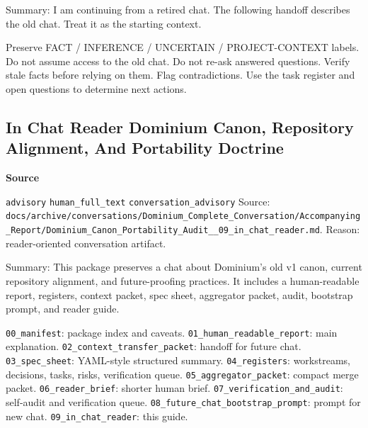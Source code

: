 \documentclass[9pt,a4paper,openany]{book}
\newcommand{\vonecallout}[3]{\par\medskip\noindent\begingroup\setlength{\fboxsep}{7pt}\colorbox{DomCalloutBg}{\parbox{0.94\linewidth}{\textbf{\textcolor{#1}{#2}}\par #3}}\endgroup\par\medskip}
\begin{document}
Summary: I am continuing from a retired chat.\allowbreak{} The following handoff describes the old chat.\allowbreak{} Treat it as the starting context.\allowbreak{}


Preserve FACT /\allowbreak{} INFERENCE /\allowbreak{} UNCERTAIN /\allowbreak{} PROJECT-\allowbreak{}CONTEXT labels.\allowbreak{} Do not assume access to the old chat.\allowbreak{} Do not re-\allowbreak{}ask answered questions.\allowbreak{} Verify stale facts before relying on them.\allowbreak{} Flag contradictions.\allowbreak{} Use the task register and open questions to determine next actions.\allowbreak{}



\subsection{In Chat Reader Dominium Canon, Repository Alignment, And Portability Doctrine}

\vonecallout{DomSlate}{Source}{\texttt{advisory} \texttt{human\_\allowbreak{}full\_\allowbreak{}text} \texttt{conversation\_\allowbreak{}advisory} Source: \texttt{docs/\allowbreak{}archive/\allowbreak{}conversations/\allowbreak{}Dominium\_\allowbreak{}Complete\_\allowbreak{}Conversation/\allowbreak{}Accompanying\_\allowbreak{}Report/\allowbreak{}Dominium\_\allowbreak{}Canon\_\allowbreak{}Portability\_\allowbreak{}Audit\_\allowbreak{}\_\allowbreak{}09\_\allowbreak{}in\_\allowbreak{}chat\_\allowbreak{}reader.\allowbreak{}md}.\allowbreak{} Reason: reader-\allowbreak{}oriented conversation artifact.\allowbreak{}}

Summary: This package preserves a chat about Dominium's old v1 canon, current repository alignment, and future-\allowbreak{}proofing practices.\allowbreak{} It includes a human-\allowbreak{}readable report, registers, context packet, spec sheet, aggregator packet, audit, bootstrap prompt, and reader guide.\allowbreak{}


\texttt{00\_\allowbreak{}manifest}: package index and caveats.\allowbreak{} \texttt{01\_\allowbreak{}human\_\allowbreak{}readable\_\allowbreak{}report}: main explanation.\allowbreak{} \texttt{02\_\allowbreak{}context\_\allowbreak{}transfer\_\allowbreak{}packet}: handoff for future chat.\allowbreak{} \texttt{03\_\allowbreak{}spec\_\allowbreak{}sheet}: YAML-\allowbreak{}style structured summary.\allowbreak{} \texttt{04\_\allowbreak{}registers}: workstreams, decisions, tasks, risks, verification queue.\allowbreak{} \texttt{05\_\allowbreak{}aggregator\_\allowbreak{}packet}: compact merge packet.\allowbreak{} \texttt{06\_\allowbreak{}reader\_\allowbreak{}brief}: shorter human brief.\allowbreak{} \texttt{07\_\allowbreak{}verification\_\allowbreak{}and\_\allowbreak{}audit}: self-\allowbreak{}audit and verification queue.\allowbreak{} \texttt{08\_\allowbreak{}future\_\allowbreak{}chat\_\allowbreak{}bootstrap\_\allowbreak{}prompt}: prompt for new chat.\allowbreak{} \texttt{09\_\allowbreak{}in\_\allowbreak{}chat\_\allowbreak{}reader}: this guide.\allowbreak{}
\end{document}
